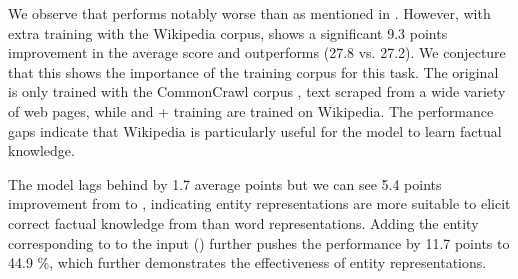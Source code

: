 \documentclass[11pt]{article}
\begin{document}
We observe that \xlmr{}\ba{} performs notably worse than \mbert{} as mentioned in \citet{kassner-etal-2021-multilingual}.
However, with extra training with the Wikipedia corpus, \xlmr{}\ba{} shows a significant 9.3 points improvement in the average score and outperforms \mbert{} (27.8 vs. 27.2).
We conjecture that this shows the importance of the training corpus for this task.
The original \xlmr{} is only trained with the CommonCrawl corpus \citep{conneau-etal-2020-unsupervised}, text scraped from a wide variety of web pages, while \mbert{} and \xlmr{} + training are trained on Wikipedia.
The performance gaps indicate that Wikipedia is particularly useful for the model to learn factual knowledge.

The \mlukeW{}\ba{} model lags behind \xlmr{}\ba{} \extraTraining{} by 1.7 average points but we can see 5.4 points improvement from \xlmr{}\ba{} \extraTraining{} to \mlukeEwithY{}, indicating entity representations are more suitable to elicit correct factual knowledge from \mluke{} than word representations.
Adding the entity corresponding to \X{} to the input (\mlukeEwithXY{}) further pushes the performance by 11.7 points to 44.9 \%, which further demonstrates the effectiveness of entity representations.
\end{document}
